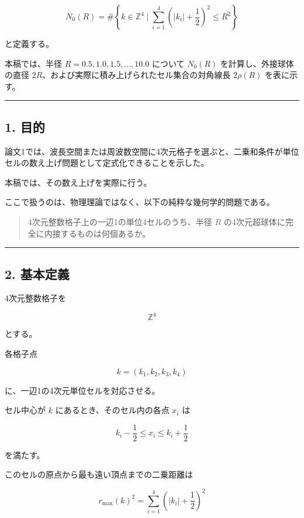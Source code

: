\documentclass[
]{ltjsarticle}
\begin{document}
\[
N_0(R)
=
\#\left\{
k\in\mathbb{Z}^4
\mid
\sum_{i=1}^{4}
\left(|k_i|+\frac12\right)^2
\le R^2
\right\}
\]

と定義する。

本稿では、半径 \(R=0.5,1.0,1.5,\ldots,10.0\) について \(N_0(R)\)
を計算し、外接球体の直径
\(2R\)、および実際に積み上げられたセル集合の対角線長 \(2\rho(R)\)
を表に示す。

\begin{center}\rule{0.5\linewidth}{0.5pt}\end{center}

\subsection{1. 目的}\label{ux76eeux7684}

論文1では、波長空間または周波数空間に4次元格子を選ぶと、二乗和条件が単位セルの数え上げ問題として定式化できることを示した。

本稿では、その数え上げを実際に行う。

ここで扱うのは、物理理論ではなく、以下の純粋な幾何学的問題である。

\begin{quote}
4次元整数格子上の一辺1の単位4セルのうち、半径 \(R\)
の4次元超球体に完全に内接するものは何個あるか。
\end{quote}

\begin{center}\rule{0.5\linewidth}{0.5pt}\end{center}

\subsection{2. 基本定義}\label{ux57faux672cux5b9aux7fa9}

4次元整数格子を

\[
\mathbb{Z}^4
\]

とする。

各格子点

\[
k=(k_1,k_2,k_3,k_4)
\]

に、一辺1の4次元単位セルを対応させる。

セル中心が \(k\) にあるとき、そのセル内の各点 \(x_i\) は

\[
k_i-\frac12\le x_i\le k_i+\frac12
\]

を満たす。

このセルの原点から最も遠い頂点までの二乗距離は

\[
r_{\max}(k)^2
=
\sum_{i=1}^{4}
\left(|k_i|+\frac12\right)^2
\]
\end{document}
